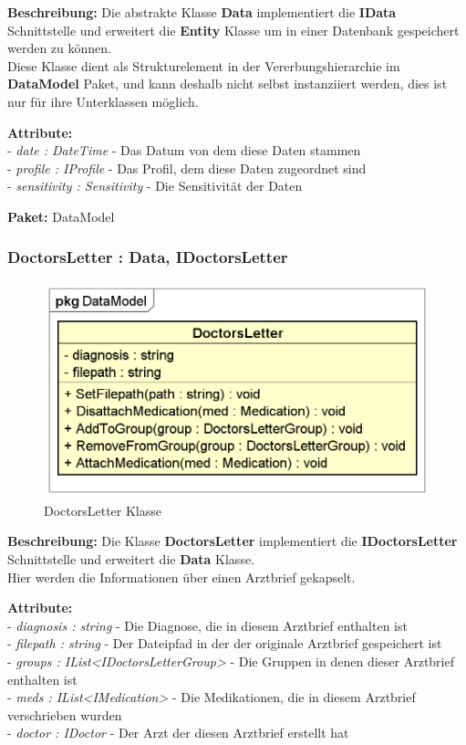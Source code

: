 \documentclass[a4paper]{scrreprt}
\begin{document}
\textbf{Beschreibung:} Die abstrakte Klasse \textbf{Data} implementiert die \textbf{IData} Schnittstelle und erweitert die \textbf{Entity} Klasse um in einer Datenbank gespeichert werden zu können.\\
Diese Klasse dient als Strukturelement in der Vererbungshierarchie im \textbf{DataModel} Paket, und kann deshalb nicht selbst instanziiert werden, dies ist nur für ihre Unterklassen möglich.

\textbf{Attribute:}\\
- \textit{date : DateTime} - Das Datum von dem diese Daten stammen\\
- \textit{profile : IProfile} - Das Profil, dem diese Daten zugeordnet sind\\
- \textit{sensitivity : Sensitivity} - Die Sensitivität der Daten

\textbf{Paket:} DataModel

\subsubsection{DoctorsLetter : Data, IDoctorsLetter}
\begin{figure}[H]
\centering
\includegraphics[width=0.45\textheight]{graphics/Klassendiagramme/Model/DoctorsLetter.png}
\caption{DoctorsLetter Klasse}
\end{figure}
\textbf{Beschreibung:} Die Klasse \textbf{DoctorsLetter} implementiert die \textbf{IDoctorsLetter} Schnittstelle und erweitert die \textbf{Data} Klasse.\\
Hier werden die Informationen über einen  Arztbrief gekapselt.

\textbf{Attribute:}\\ 
- \textit{diagnosis : string} - Die Diagnose, die in diesem Arztbrief enthalten ist\\
- \textit{filepath : string} - Der Dateipfad in der der originale Arztbrief gespeichert ist\\
- \textit{groups : IList<IDoctorsLetterGroup>} - Die Gruppen in denen dieser Arztbrief enthalten ist\\
- \textit{meds : IList<IMedication>} - Die Medikationen, die in diesem Arztbrief verschrieben wurden\\
- \textit{doctor : IDoctor} - Der Arzt der diesen Arztbrief erstellt hat
\end{document}
